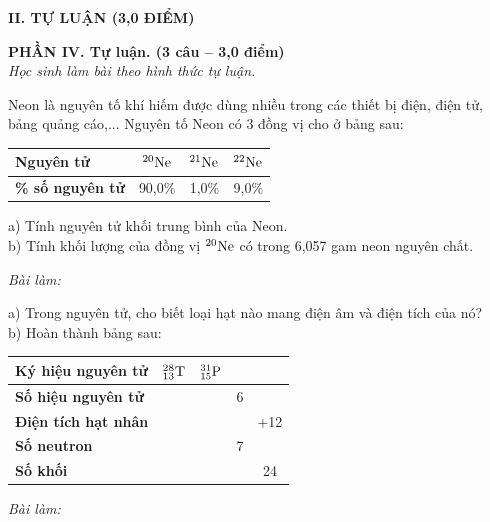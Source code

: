 \documentclass[11pt,a4paper]{article}
\begin{document}
\vspace{4pt}
\noindent
{\color{mainGreen}\textbf{\Large II. TỰ LUẬN (3,0 ĐIỂM)}}

\vspace{3pt}
\noindent
{\color{mainGreen}\textbf{\large PHẦN IV. Tự luận. (3 câu -- 3,0 điểm)}}\\
\textit{\small Học sinh làm bài theo hình thức tự luận.}
\vspace{2pt}

\begin{ex}
Neon là nguyên tố khí hiếm được dùng nhiều trong các thiết bị điện, điện tử, bảng quảng cáo,... Nguyên tố Neon có 3 đồng vị cho ở bảng sau:
\begin{center}
\renewcommand{\arraystretch}{1.2}
\begin{tabular}{|l|c|c|c|}
\hline
\rowcolor{tableGreen}
\textbf{Nguyên tử} & $^{20}\ce{Ne}$ & $^{21}\ce{Ne}$ & $^{22}\ce{Ne}$ \\
\hline
\textbf{\% số nguyên tử} & 90,0\% & 1,0\% & 9,0\% \\
\hline
\end{tabular}
\end{center}
a) Tính nguyên tử khối trung bình của Neon.\\
b) Tính khối lượng của đồng vị $^{20}\ce{Ne}$ có trong 6,057 gam neon nguyên chất.

\vspace{1pt}
\noindent\textit{Bài làm:}\\
\end{ex}
\begin{ex}
a) Trong nguyên tử, cho biết loại hạt nào mang điện âm và điện tích của nó?\\
b) Hoàn thành bảng sau:
\begin{center}
\renewcommand{\arraystretch}{1.2}
\begin{tabular}{|l|c|c|c|c|}
\hline
\rowcolor{tableGreen}
\textbf{Ký hiệu nguyên tử} & $^{28}_{13}\ce{T}$ & $^{31}_{15}\ce{P}$ &  &  \\
\hline
\textbf{Số hiệu nguyên tử} &  &  & 6 &  \\
\hline
\textbf{Điện tích hạt nhân} &  &  &  & +12 \\
\hline
\textbf{Số neutron} &  &  & 7 &  \\
\hline
\textbf{Số khối} &  &  &  & 24 \\
\hline
\end{tabular}
\end{center}

\vspace{1pt}
\noindent\textit{Bài làm:}\\
\end{ex}
\end{document}
